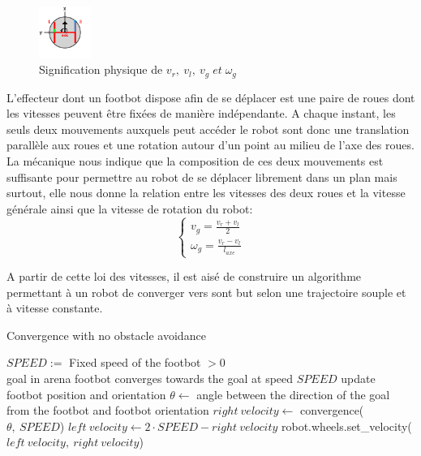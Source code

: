 \documentclass[a4paper]{report}
\begin{document}
\begin{figure}
  \vspace{-30pt}
  \begin{center}
    \includegraphics[width=0.15\textwidth]{robotWheels.png}
  \end{center}
  \caption{Signification physique de \(v_r,\: v_l,\: v_g \; et \; \omega_g \)\cite{argosSite1}}
\end{figure}
L'effecteur dont un footbot dispose afin de se déplacer est une paire de roues dont les vitesses peuvent être fixées de manière indépendante. A chaque instant, les seuls deux mouvements auxquels peut accéder le robot sont donc une translation parallèle aux roues et une rotation autour d'un point au milieu de l'axe des roues. La mécanique\cite{meca} nous indique que la composition de ces deux mouvements est suffisante pour permettre au robot de se déplacer librement dans un plan mais surtout, elle nous donne la relation entre les vitesses des deux roues et la vitesse générale ainsi que la vitesse de rotation du robot:
\begin{equation}
\begin{cases}
v_g=\frac{v_r+v_l}{2}\\
\omega_g=\frac{v_r-v_l}{l_{axe}}
\end{cases}  
\end{equation}

A partir de cette loi des vitesses, il est aisé de construire un algorithme permettant à un robot de converger vers sont but selon une trajectoire souple et à vitesse constante.
\begin{algorithm}                    
\caption{Convergence with no obstacle avoidance}
\label{simpleConvergence}
\begin{algorithmic}[1]
  \REQUIRE \(SPEED :=\) Fixed speed of the footbot \(> 0\)\\goal in arena
  \ENSURE footbot converges towards the goal at speed \(SPEED\)
    \STATE update footbot position and orientation
    \STATE \( \theta \leftarrow\) angle between the direction of the goal from the footbot and footbot orientation
    \STATE \( right\:velocity \leftarrow\) convergence(\(\theta,\:SPEED\))
    \STATE \( left\:velocity \leftarrow 2\cdot SPEED-right\:velocity\) 
    \STATE robot.wheels.set\_velocity(\(left\:velocity,\:right\:velocity\))
  \ENDWHILE
\end{algorithmic}
\end{algorithm}
\end{document}
